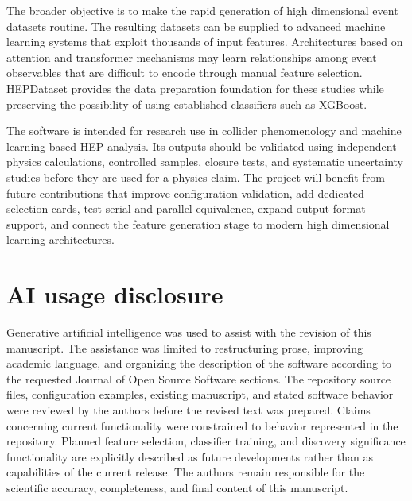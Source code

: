 \documentclass[11pt,a4paper]{article}
\begin{document}
The broader objective is to make the rapid generation of high dimensional event
datasets routine. The resulting datasets can be supplied to advanced machine
learning systems that exploit thousands of input features. Architectures based
on attention and transformer mechanisms may learn relationships among event
observables that are difficult to encode through manual feature selection.
HEPDataset provides the data preparation foundation for these studies while
preserving the possibility of using established classifiers such as XGBoost.

The software is intended for research use in collider phenomenology and machine
learning based HEP analysis. Its outputs should be validated using independent
physics calculations, controlled samples, closure tests, and systematic
uncertainty studies before they are used for a physics claim. The project will
benefit from future contributions that improve configuration validation, add
dedicated selection cards, test serial and parallel equivalence, expand output
format support, and connect the feature generation stage to modern high
dimensional learning architectures.

\section{AI usage disclosure}

Generative artificial intelligence was used to assist with the revision of this
manuscript. The assistance was limited to restructuring prose, improving academic
language, and organizing the description of the software according to the
requested Journal of Open Source Software sections. The repository source files,
configuration examples, existing manuscript, and stated software behavior were
reviewed by the authors before the revised text was prepared. Claims concerning
current functionality were constrained to behavior represented in the repository.
Planned feature selection, classifier training, and discovery significance
functionality are explicitly described as future developments rather than as
capabilities of the current release. The authors remain responsible for the
scientific accuracy, completeness, and final content of this manuscript.
\end{document}
